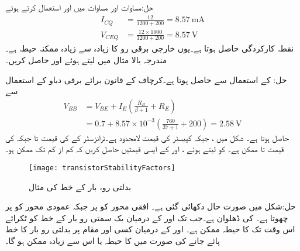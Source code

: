 حل:مساوات  اور مساوات  میں  اور  استعمال کرتے ہوئے
\begin{align*}
I_{CQ}&=\frac{12}{1200+200}=\SI{8.57}{\milli \ampere}\\
V_{CEQ}&=\frac{12 \times 1000}{1200+200}=\SI{8.57}{\volt}
\end{align*}
نقطہ کارکردگی حاصل ہوتا ہے۔یوں خارجی برقی رو کا زیادہ سے زیادہ ممکنہ حیطہ  ہے۔
مندرجہ بالا مثال میں  لیتے ہوئے  اور  حاصل کریں۔

حل: کے استعمال سے   حاصل ہوتا ہے۔کرچاف کے قانون برائے برقی دباو کے استعمال سے
\begin{align*}
V_{BB}&=V_{BE}+I_E \left(\frac{R_B}{\beta+1}+R_E \right)\\
&=0.7+8.57 \times 10^{-3} \left(\frac{760}{37+1}+200 \right)=\SI{2.58}{\volt}
\end{align*}
حاصل ہوتا ہے۔
شکل  میں ،  جبکہ کپیسٹر کی قیمت لامحدود ہے۔ٹرانزسٹر کے  کی قیمت  تا  جبکہ  کی قیمت  تا  ممکن ہے۔ کو  لیتے ہوئے ،  اور  کے ایسی قیمتیں حاصل کریں کہ  کم از کم  تک ممکن ہو۔ 
\begin{figure}
\centering
\texttt{[image: transistorStabilityFactors]}
\caption{بدلتی رو، بار کے خط کی مثال}
\label{شکل_ٹرانزسٹر_بدلتی_رو_بار_خط_مثال}
\end{figure}

حل:شکل  میں صورت حال دکھائی گئی ہے۔ افقی محور کو  پر جبکہ عمودی محور کو  پر چھوتا ہے۔ کی ڈھلوان  ہے۔جب تک   اور  کے درمیان یک سمتی رو بار کے خط کو ٹکرائے اس وقت تک  کا حیطہ  ممکن ہے۔ اور  کے درمیان کسی اور مقام پر بدلتی رو بار کا خط پائے جانے کی صورت میں  کا حیطہ  یا اس سے زیادہ ممکن ہو گا۔


